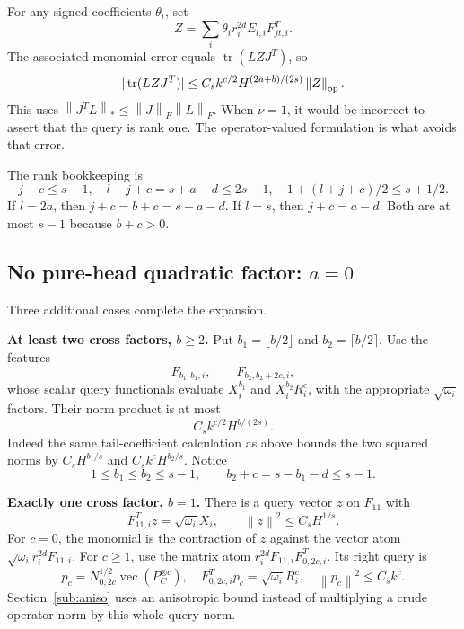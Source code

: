 \documentclass[11pt]{article}
\theoremstyle{remark}\newtheorem{remark}[theorem]{Remark}
\newcommand{\tr}{\operatorname{tr}}\newcommand{\rank}{\operatorname{rank}}
\newcommand{\norm}[1]{\left\|#1\right\|}\newcommand{\ip}[2]{\left\langle #1,#2\right\rangle}
\begin{document}
For any signed coefficients $\theta_i$, set
\[
 Z=\sum_i\theta_i r_i^{2d}E_{l,i}F_{jt,i}^T.
\]
The associated monomial error equals $\tr(LZJ^T)$, so
\begin{equation}\label{eq:op-query}
 |\tr(LZJ^T)|\le C_s k^{c/2}H^{(2a+b)/(2s)}\norm Z_{\op}.
\end{equation}
This uses $\norm{J^TL}_*\le\norm J_F\norm L_F$. When $\nu=1$, it would be incorrect to assert that the query is rank one. The operator-valued formulation is what avoids that error.

The rank bookkeeping is
\begin{equation}\label{eq:rank-book}
 j+c\le s-1,\quad l+j+c=s+a-d\le2s-1,\quad 1+(l+j+c)/2\le s+1/2.
\end{equation}
If $l=2a$, then $j+c=b+c=s-a-d$. If $l=s$, then $j+c=a-d$. Both are at most $s-1$ because $b+c>0$.

\subsection[No pure-head quadratic factor]{No pure-head quadratic factor: $a=0$}
Three additional cases complete the expansion.

\textbf{At least two cross factors, $b\ge2$.} Put $b_1=\lfloor b/2\rfloor$ and $b_2=\lceil b/2\rceil$. Use the features
\[
 F_{b_1,b_1,i},\qquad F_{b_2,b_2+2c,i},
\]
whose scalar query functionals evaluate $X_i^{b_1}$ and $X_i^{b_2}R_i^c$, with the appropriate $\sqrt{\omega_i}$ factors. Their norm product is at most
\begin{equation}\label{eq:balanced-query}
 C_s k^{c/2}H^{b/(2s)}.
\end{equation}
Indeed the same tail-coefficient calculation as above bounds the two squared norms by $C_sH^{b_1/s}$ and $C_s k^cH^{b_2/s}$. Notice
\begin{equation}\label{eq:balanced-rank}
 1\le b_1\le b_2\le s-1,\qquad b_2+c=s-b_1-d\le s-1.
\end{equation}

\textbf{Exactly one cross factor, $b=1$.} There is a query vector $z$ on $F_{11}$ with
\[
 F_{11,i}^Tz=\sqrt{\omega_i}X_i,\qquad \norm z^2\le C_sH^{1/s}.
\]
For $c=0$, the monomial is the contraction of $z$ against the vector atom $\sqrt{\omega_i}r_i^{2d}F_{11,i}$. For $c\ge1$, use the matrix atom $r_i^{2d}F_{11,i}F_{0,2c,i}^T$. Its right query is
\begin{equation}\label{eq:pquery}
 p_c=N_{0,2c}^{1/2}\operatorname{vec}(P_C^{\otimes c}),\quad
 F_{0,2c,i}^Tp_c=\sqrt{\omega_i}R_i^c,\quad \norm{p_c}^2\le C_s k^c.
\end{equation}
Section~\ref{sub:aniso} uses an anisotropic bound instead of multiplying a crude operator norm by this whole query norm.
\end{document}
